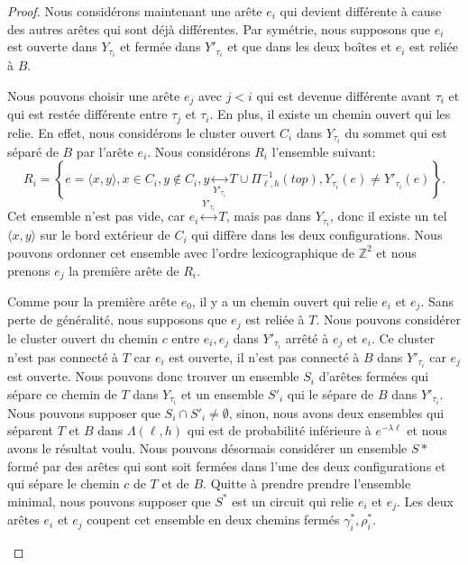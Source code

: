 \documentclass[titlepage,a4paper,12pt]{article}
\begin{document}
\begin{proof}
Nous considérons maintenant une arête $e_i$ qui devient différente à cause des autres arêtes qui sont déjà différentes. Par symétrie, nous supposons que $e_i$ est ouverte dans $Y_{\tau_i}$ et fermée dans $Y'_{\tau_i}$ et que dans les deux boîtes et $e_i$ est reliée à $B$.

Nous pouvons choisir une arête $e_j$ avec $j< i$ qui est devenue différente avant $\tau_i$ et qui est restée différente entre $\tau_j$ et $\tau_i$. En plus, il existe un chemin ouvert qui les relie. En effet, nous considérons le cluster ouvert $C_i$ dans $Y_{\tau_i}$ du sommet qui est séparé de $B$ par l'arête $e_i$. Nous considérons $R_i$ l'ensemble suivant:
$$ R_i = \left\lbrace e = \langle x,y\rangle, x\in C_i, y\notin C_i, y\underset{Y'_{\tau_i}}{\leftrightarrow} T\cup \Pi_{\ell,h}^{-1}(top), Y_{\tau_i}(e)\neq Y'_{\tau_i}(e) \right\rbrace.
$$
Cet ensemble n'est pas vide, car $e_i\overset{Y'_{\tau_i}}{\leftrightarrow} T$, mais pas dans $Y_{\tau_i}$, donc il existe un tel $\langle x,y\rangle$ sur le bord extérieur de $C_i$ qui diffère dans les deux configurations. Nous pouvons ordonner cet ensemble avec l'ordre lexicographique de $\mathbb{Z}^2$ et nous prenons $e_j$ la première arête de $R_i$.

Comme pour la première arête $e_0$, il y a un chemin ouvert qui relie $e_i$ et $e_j$. Sans perte de généralité, nous supposons que $e_j$ est reliée à $T$.
Nous pouvons considérer le cluster ouvert du chemin $c$ entre $e_i,e_j$ dans $Y'_{\tau_i}$ arrêté à $e_j$ et $e_i$. Ce cluster n'est pas connecté à $T$ car $e_i$ est ouverte, il n'est pas connecté à $B$ dans $Y'_{\tau_i}$ car $e_j$ est ouverte. Nous pouvons donc trouver un ensemble $S_i$ d'arêtes fermées qui sépare ce chemin de $T$ dans $Y_{\tau_i}$ et un ensemble $S'_i$ qui le sépare de $B$ dans $Y'_{\tau_i}$. Nous pouvons supposer que $S_i\cap S'_i \neq \emptyset$, sinon, nous avons deux ensembles qui séparent $T$ et $B$ dans $\Lambda(\ell,h)$ qui est de probabilité inférieure à $e^{-\lambda \ell}$ et nous avons le résultat voulu. Nous pouvons désormais considérer un ensemble $S*$ formé par des arêtes qui sont soit fermées dans l'une des deux configurations et qui sépare le chemin $c$ de $T$ et de $B$. Quitte à prendre prendre l'ensemble minimal, nous pouvons supposer que $S^*$ est un circuit qui relie $e_i$ et $e_j$. Les deux arêtes $e_i$ et $e_j$ coupent cet ensemble en deux chemins fermés $\gamma_i^*, \rho_i^*$.
\begin{figure}[h]


\end{figure}
\end{proof}
\end{document}
